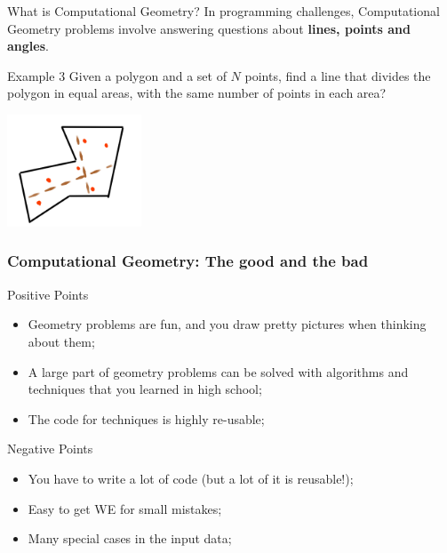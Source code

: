 \begin{frame}[t]{What is Computational Geometry?}
  In programming challenges, Computational Geometry problems involve answering questions about {\bf lines, points and angles}.

  \begin{block}{Example 3}
    Given a polygon and a set of $N$ points, find a line that divides the polygon in equal areas, with the same number of points in each area?
  \end{block}

  \begin{center}
    \includegraphics[width=0.3\textwidth]{img/sampleproblem_3.png}
  \end{center}
\end{frame}


\begin{frame}
  \frametitle{Computational Geometry: The good and the bad}

  \begin{block}{Positive Points}
    \begin{itemize}
      \item Geometry problems are fun, and you draw pretty pictures when thinking about them;
      \item A large part of geometry problems can be solved with algorithms and techniques that you learned in high school;
      \item The code for techniques is highly re-usable;
    \end{itemize}
  \end{block}

  \begin{alertblock}{Negative Points}
    \begin{itemize}
      \item You have to write a lot of code (but a lot of it is reusable!);
      \item Easy to get WE for small mistakes;
      \item Many special cases in the input data;
    \end{itemize}
  \end{alertblock}
\end{frame}


